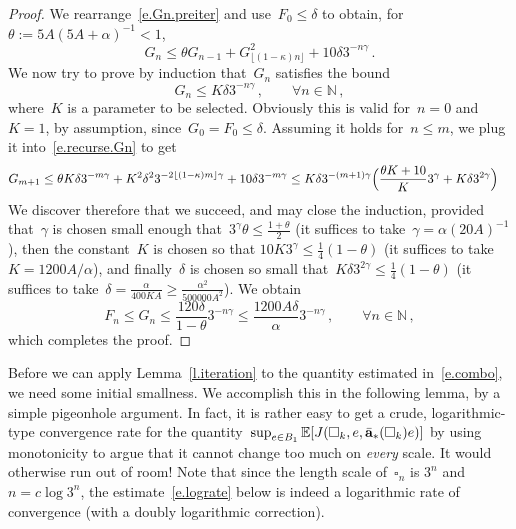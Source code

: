 \documentclass[11pt]{article} %
\let\oldsquare\square %
\renewcommand{\square}{\oldsquare}
\numberwithin{equation}{section}
\theoremstyle{definition}
\let\originalleft\left
\let\originalright\right
\renewcommand{\left}{\mathopen{}\mathclose\bgroup\originalleft}
\renewcommand{\right}{\aftergroup\egroup\originalright}
\newcommand*{\N}{\ensuremath{\mathbb{N}}}
\renewcommand{\a}{\mathbf{a}}
\newcommand{\ahom}{\bar{\a}}
\newcommand{\cu}{\square}
\newcommand{\E}{\mathbb{E}}
\begin{document}
\begin{proof}
\smallskip

We rearrange~\eqref{e.Gn.preiter} and use~$F_0 \leq \delta$ to obtain, for~$\theta := 5A (5A+\alpha)^{-1} < 1$,
\begin{equation}
\label{e.recurse.Gn}
G_n \leq 
\theta  G_{n-1} 
+
G_{\lfloor (1-\kappa) n \rfloor}^2 
+
10 \delta 3^{-n\gamma}\,.
\end{equation}
We now try to prove by induction that~$G_n$ satisfies the bound
\begin{equation*}
G_n \leq K \delta 3^{-n\gamma}\,, \qquad \forall n\in\N\,,
\end{equation*}	
where~$K$ is a parameter to be selected. Obviously this is valid for~$n =0$ and $K=1$, by assumption, since~$G_0 = F_0 \leq \delta$. 
Assuming it holds for~$n \leq m$, we plug it into~\eqref{e.recurse.Gn} to get
\begin{align*}
G_{m+1} 
&
\leq 
\theta K \delta 3^{-m\gamma}
+
K^2 \delta^2 3^{-2 \lfloor (1-\kappa) m \rfloor \gamma}
+
10 \delta 3^{-m\gamma}
\leq
K\delta 3^{-(m+1) \gamma}
\Bigl( 
\frac{\theta K + 10}{K} 3^\gamma
+
K\delta 3^{2\gamma}
\Bigr)
\end{align*}
We discover therefore that we succeed, and may close the induction, provided that~$\gamma$ is chosen small enough that~$3^\gamma \theta \leq \frac{1+\theta}{2}$ (it suffices to take~$\gamma = \alpha(20A)^{-1}$), then the constant~$K$ is chosen so that ${10}{K} 3^\gamma \leq \frac14(1-\theta)$ (it suffices to take~$K=1200A/\alpha$), and finally~$\delta$ is chosen so small that~$K\delta 3^{2\gamma} \leq \frac14(1-\theta)$ (it suffices to take~$\delta = \frac{\alpha}{400KA}\geq \frac{\alpha^2}{500000 A^2}$). We obtain 
\begin{equation*}
F_n \leq G_n \leq \frac{120\delta}{1-\theta} 3^{-n\gamma}
\leq 
\frac{1200A\delta}{\alpha} 3^{-n\gamma}
\,, \qquad \forall n\in\N\,,
\end{equation*}
which completes the proof. 
\end{proof}



Before we can apply Lemma~\ref{l.iteration} to the quantity estimated in~\eqref{e.combo}, we need some initial smallness. 
We accomplish this in the following lemma, by a simple pigeonhole argument. In fact, it is rather easy to get a crude, logarithmic-type convergence rate 
for the quantity~$\sup_{e\in B_1 }
\E \left[ J(\cu_k,e,\ahom_*(\cu_k) e) \right]$ by using monotonicity to argue that it cannot change too much on \emph{every} scale. It would otherwise run out of room! Note that since the length scale of~$\cu_n$ is $3^n$ and~$n = c\log 3^n$, the estimate~\eqref{e.lograte} below is indeed a logarithmic rate of convergence (with a doubly logarithmic correction). 
\end{document}
